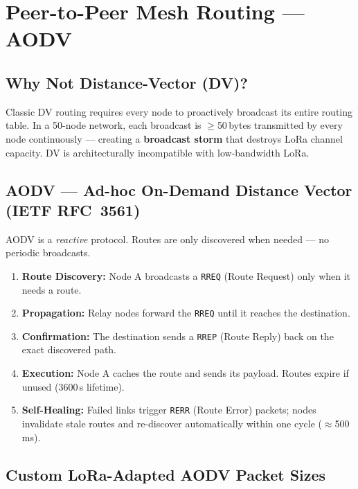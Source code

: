 \documentclass[12pt,a4paper]{article}
\begin{document}
\section{Peer-to-Peer Mesh Routing --- AODV}

\subsection{Why Not Distance-Vector (DV)?}

Classic DV routing requires every node to proactively broadcast its entire routing table. In a 50-node network, each broadcast is $\ge$50\,bytes transmitted by every node continuously --- creating a \textbf{broadcast storm} that destroys LoRa channel capacity. DV is architecturally incompatible with low-bandwidth LoRa.

\subsection{AODV --- Ad-hoc On-Demand Distance Vector (IETF RFC~3561)}

AODV is a \textit{reactive} protocol. Routes are only discovered when needed --- no periodic broadcasts.

\begin{enumerate}
    \item \textbf{Route Discovery:} Node A broadcasts a \texttt{RREQ} (Route Request) only when it needs a route.
    \item \textbf{Propagation:} Relay nodes forward the \texttt{RREQ} until it reaches the destination.
    \item \textbf{Confirmation:} The destination sends a \texttt{RREP} (Route Reply) back on the exact discovered path.
    \item \textbf{Execution:} Node A caches the route and sends its payload. Routes expire if unused (3600\,s lifetime).
    \item \textbf{Self-Healing:} Failed links trigger \texttt{RERR} (Route Error) packets; nodes invalidate stale routes and re-discover automatically within one cycle ($\approx$500\,ms).
\end{enumerate}

\subsection{Custom LoRa-Adapted AODV Packet Sizes}
\end{document}

